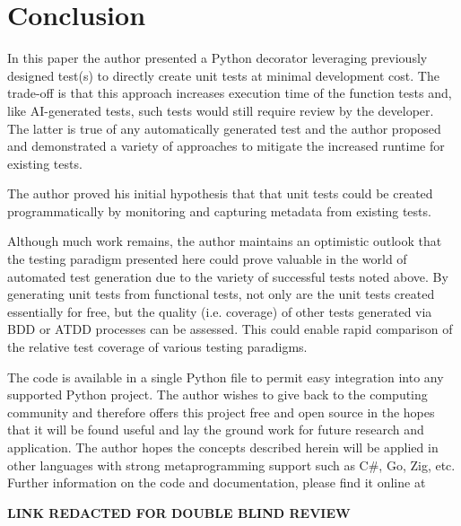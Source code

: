 \section{Conclusion}\label{sec:conclusion}
In this paper the author presented
a Python decorator leveraging previously designed test(s) to directly create 
unit tests at minimal development cost.
The trade-off is that this approach increases execution time of the function 
tests and, like AI-generated tests, such tests would still require review by the 
developer. The latter is true of any automatically generated test and 
the author proposed and demonstrated a variety of approaches to 
mitigate the increased runtime for existing tests.

The author proved his initial hypothesis that 
that unit tests could be
created programmatically by monitoring and capturing 
metadata from existing tests.

Although much work remains, the author maintains an optimistic outlook
that the testing paradigm presented here could prove valuable in the 
world of automated test generation due to the variety of successful 
tests noted above.  By generating unit tests from functional tests, 
not only are the unit tests created essentially for free,
but the quality (i.e. coverage) of other tests generated via BDD or ATDD 
processes can be assessed. This could enable rapid comparison
of the relative test coverage of various testing paradigms.

The code is available in a single Python file to permit 
easy integration into any supported Python project.
The author wishes to give back to the computing community
and therefore offers this project free and open source
in the hopes that it will be found useful and lay the ground
work for future research and application.
The author hopes the concepts described herein will be 
applied in other languages with strong metaprogramming support
such as C\#, Go, Zig, etc. Further information on the code and  documentation, please
find it online at
%
\begin{center}
  \textbf{LINK REDACTED FOR DOUBLE BLIND REVIEW}
\end{center}


